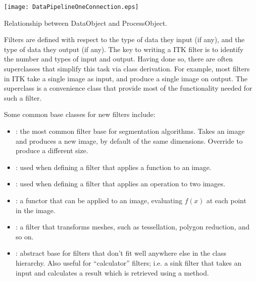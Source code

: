 \begin{floatingfigure}[rlp]{7cm}
  \centering
  \texttt{[image: DataPipelineOneConnection.eps]}
  \caption[Relationship between DataObjects and ProcessObjects]
{Relationship between DataObject and ProcessObject.
\label{fig:DataPipeLineOneConnection}}
\end{floatingfigure}


Filters are defined with respect to the type of data they input (if
any), and the type of data they output (if any). The key to writing a
ITK filter is to identify the number and types of input and
output. Having done so, there are often superclasses that simplify
this task via class derivation. For example, most filters in ITK take
a single image as input, and produce a single image on output. The
superclass  is a convenience class that
provide most of the functionality needed for such a filter.

Some common base classes for new filters include:

\begin{itemize}

  \item {}: the most common filter base for
    segmentation algorithms.  Takes an image and produces a new image, by
    default of the same dimensions.  Override
     to produce a different size.

  \item {}: used when defining a filter that
  applies a function to an image.

  \item {}: used when defining a filter that
  applies an operation to two images.

  \item {}: a functor that can be applied to an image,
  evaluating $f(x) $ at each point in the image.

  \item {}: a filter that transforms meshes, such as
  tessellation, polygon reduction, and so on.

  \item {}: abstract base for filters that don't fit well
  anywhere else in the class hierarchy.  Also useful for ``calculator''
  filters; i.e. a sink filter that takes an input and calculates a result
  which is retrieved using a  method.

\end{itemize}

